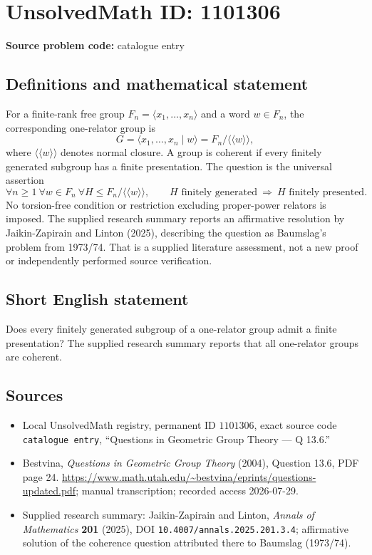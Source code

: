 \documentclass[11pt]{article}
\begin{document}
\section*{UnsolvedMath ID: 1101306}
\textbf{Source problem code:} catalogue entry
\subsection{Definitions and mathematical statement}
For a finite-rank free group \(F_n=\langle x_1,\ldots,x_n\rangle\) and a word \(w\in F_n\), the corresponding one-relator group is
\[
G=\langle x_1,\ldots,x_n\mid w\rangle=F_n/\langle\!\langle w\rangle\!\rangle,
\]
where \(\langle\!\langle w\rangle\!\rangle\) denotes normal closure. A group is coherent if every finitely generated subgroup has a finite presentation. The question is the universal assertion
\[
\forall n\ge1\ \forall w\in F_n\ \forall H\le F_n/\langle\!\langle w\rangle\!\rangle,
\qquad H\text{ finitely generated}\ \Longrightarrow\ H\text{ finitely presented}.
\]
No torsion-free condition or restriction excluding proper-power relators is imposed. The supplied research summary reports an affirmative resolution by Jaikin-Zapirain and Linton (2025), describing the question as Baumslag's problem from 1973/74. That is a supplied literature assessment, not a new proof or independently performed source verification.
\subsection{Short English statement}
Does every finitely generated subgroup of a one-relator group admit a finite presentation? The supplied research summary reports that all one-relator groups are coherent.
\subsection{Sources}
\begin{itemize}
\item Local UnsolvedMath registry, permanent ID \(1101306\), exact source code \texttt{catalogue entry}, ``Questions in Geometric Group Theory --- Q 13.6.''
\item Bestvina, \emph{Questions in Geometric Group Theory} (2004), Question 13.6, PDF page 24. \url{https://www.math.utah.edu/~bestvina/eprints/questions-updated.pdf}; manual transcription; recorded access 2026-07-29.
\item Supplied research summary: Jaikin-Zapirain and Linton, \emph{Annals of Mathematics} \textbf{201} (2025), DOI \texttt{10.4007/annals.2025.201.3.4}; affirmative solution of the coherence question attributed there to Baumslag (1973/74).
\end{itemize}
\end{document}
